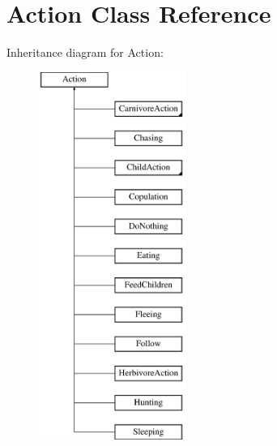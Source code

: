 \hypertarget{class_action}{}\section{Action Class Reference}
\label{class_action}
Inheritance diagram for Action\+:\begin{figure}[H]
\begin{center}
\leavevmode
\includegraphics[height=12.000000cm]{class_action}
\end{center}
\end{figure}
